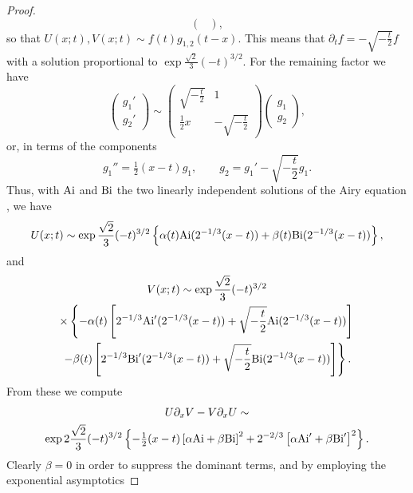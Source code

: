 \documentclass[10pt,reqno]{amsart}
\theoremstyle{plain}
\theoremstyle{definition}
\theoremstyle{remark}
\begin{document}
\begin{proof}
\begin{equation}
\begin{pmatrix}
            \end{pmatrix} ,
\label{}
\end{equation}
so that $ U(x;t),V(x;t) \sim f(t)g_{1,2}(t-x) $. This means that $ \partial_t f = -\sqrt{-\frac{t}{2}}f $
with a solution proportional to $ \exp\frac{\sqrt{2}}{3}(-t)^{3/2} $. For the remaining factor we have
\begin{equation}
  \begin{pmatrix}
             g_{1}' \\ g_{2}'
  \end{pmatrix}
 \sim \begin{pmatrix}
            \sqrt{-\frac{t}{2}} & 1 \\ \frac{1}{2}x & -\sqrt{-\frac{t}{2}} 
      \end{pmatrix}
      \begin{pmatrix}
             g_{1} \\ g_{2}
      \end{pmatrix} ,
\label{}
\end{equation}
or, in terms of the components
\begin{equation}
   g_{1}'' = \tfrac{1}{2}(x-t)g_{1}, \qquad g_{2} = g_{1}'-\sqrt{-\frac{t}{2}}g_{1}.
\end{equation} 
Thus, with $ {\rm Ai} $ and $ {\rm Bi} $ the two linearly independent solutions of the Airy equation
\cite[]{DLMF}, we have
\begin{equation}
  U(x;t) \sim \exp\frac{\sqrt{2}}{3}(-t)^{3/2}
  \left\{ \alpha(t){\rm Ai}(2^{-1/3}(x-t))+\beta(t){\rm Bi}(2^{-1/3}(x-t)) \right\} ,
\end{equation} 
and
\begin{multline}
  V(x;t) \sim \exp\frac{\sqrt{2}}{3}(-t)^{3/2}
\\ \times
  \left\{ -\alpha(t)\left[ 2^{-1/3}{\rm Ai}'(2^{-1/3}(x-t))+\sqrt{-\frac{t}{2}}{\rm Ai}(2^{-1/3}(x-t)) \right] \right.
\\
  \left.   -\beta(t)\left[ 2^{-1/3}{\rm Bi}'(2^{-1/3}(x-t))+\sqrt{-\frac{t}{2}}{\rm Bi}(2^{-1/3}(x-t)) \right] \right\} .
\end{multline}
From these we compute
\begin{multline}
 U\partial_x V-V\partial_x U \sim 
\\
   \exp2\frac{\sqrt{2}}{3}(-t)^{3/2}
                \left\{ -\tfrac{1}{2}(x-t)\left[ \alpha{\rm Ai}+\beta{\rm Bi} \right]^2+2^{-2/3}\left[ \alpha{\rm Ai}'+\beta{\rm Bi}' \right]^2 \right\} .
\end{multline} 
Clearly $ \beta=0 $ in order to suppress the dominant terms, and by employing the exponential asymptotics 

\end{proof}
\end{document}
